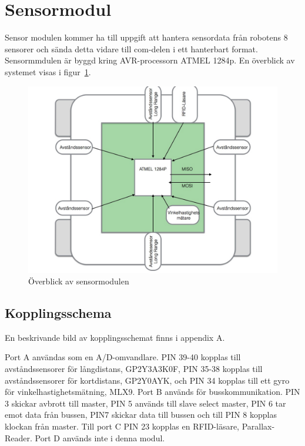\documentclass[a4paper,12pt,fleqn]{article}
\begin{document}
\section{Sensormodul}
Sensor modulen kommer ha till uppgift att hantera sensordata från robotens 8 sensorer och sända detta vidare till com-delen i ett hanterbart format. Sensormmdulen är byggd kring AVR-processorn ATMEL 1284p. En överblick av systemet visas i figur~\ref{fig:sensoroverview}.

\begin{figure}[htp] %
  \begin{center}
  \includegraphics[keepaspectratio=true,width=\linewidth]{overblicksensor}  %
  \end{center}
  \caption{Överblick av sensormodulen} %
  \label{fig:sensoroverview}
\end{figure}

\subsection{Kopplingsschema}

En beskrivande bild av kopplingsschemat finns i appendix A.

Port A användas som en A/D-omvandlare. PIN 39-40 kopplas till avståndssensorer för långdistans, GP\-2Y\-3A\-3K\-0F, PIN 35-38 kopplas till avståndssensorer för kortdistans, GP\-2Y\-0A\-YK, och PIN 34 kopplas till ett gyro för vinkelhastighetsmätning, ML\-X9. Port B används för busskommunikation. PIN 3 skickar avbrott till master, PIN 5 används till slave select master, PIN 6 tar emot data från bussen, PIN7 skickar data till bussen och till PIN 8 kopplas klockan från master. Till port C PIN 23 kopplas en RFID-läsare, Parallax-Reader. Port D används inte i denna modul. 
\end{document}
